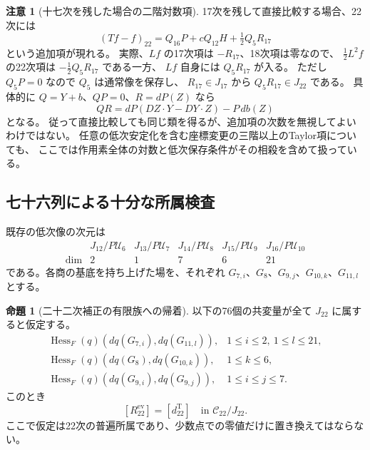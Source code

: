 \documentclass[a4paper,11pt]{ltjsarticle}
\theoremstyle{definition}
\newtheorem{remark}[theorem]{注意}
\newtheorem{proposition}[theorem]{命題}
\begin{document}
\begin{remark}[十七次を残した場合の二階対数項]
17次を残して直接比較する場合、22次には
\[
 (Tf-f)_{22}=Q_{16}P+cQ_{12}H+\tfrac12Q_5R_{17}
\]
という追加項が現れる。
実際、$Lf$ の17次項は $-R_{17}$、18次項は零なので、
$\tfrac12L^2f$ の22次項は $-\tfrac12Q_5R_{17}$ である一方、
$Lf$ 自身には $Q_5R_{17}$ が入る。
ただし $Q_5P=0$ なので $Q_5$ は通常像を保存し、
$R_{17}\in J_{17}$ から $Q_5R_{17}\in J_{22}$ である。
具体的に $Q=Y+b$、$QP=0$、$R=dP(Z)$ なら
\[
 QR=dP(DZ\cdot Y-DY\cdot Z)-P\,db(Z)
\]
となる。
従って直接比較しても同じ類を得るが、追加項の次数を無視してよいわけではない。
任意の低次安定化を含む座標変更の三階以上のTaylor項についても、
ここでは作用素全体の対数と低次保存条件がその相殺を含めて扱っている。
\end{remark}

\subsection{七十六列による十分な所属検査}

既存の低次像の次元は
\[
\begin{array}{c|ccccc}
 &J_{12}/P\mathcal U_6&J_{13}/P\mathcal U_7&J_{14}/P\mathcal U_8
 &J_{15}/P\mathcal U_9&J_{16}/P\mathcal U_{10}\\\hline
\dim&2&1&7&6&21
\end{array}
\]
である。各商の基底を持ち上げた場を、それぞれ
$G_{7,i}$、$G_8$、$G_{9,j}$、$G_{10,k}$、$G_{11,l}$ とする。

\begin{proposition}[二十二次補正の有限族への帰着]
\label{prop:v16-seventy-six-lower-pairings}
以下の76個の共変量が全て $J_{22}$ に属すると仮定する。
\[
\begin{array}{ll}
 \operatorname{Hess}_F(q)(dq(G_{7,i}),dq(G_{11,l})),&1\le i\le2,\ 1\le l\le21,\\
 \operatorname{Hess}_F(q)(dq(G_8),dq(G_{10,k})),&1\le k\le6,\\
 \operatorname{Hess}_F(q)(dq(G_{9,i}),dq(G_{9,j})),&1\le i\le j\le7.
\end{array}
\]
このとき
\begin{equation}\label{eq:v16-raw-twenty-second-suffices}
 [R_{22}^{\mathrm{ev}}]=[d_{22}^{\mathrm T}]
                         \quad\text{in }\mathcal C_{22}/J_{22}.
\end{equation}
ここで仮定は22次の普遍所属であり、少数点での零値だけに置き換えてはならない。
\end{proposition}
\end{document}
